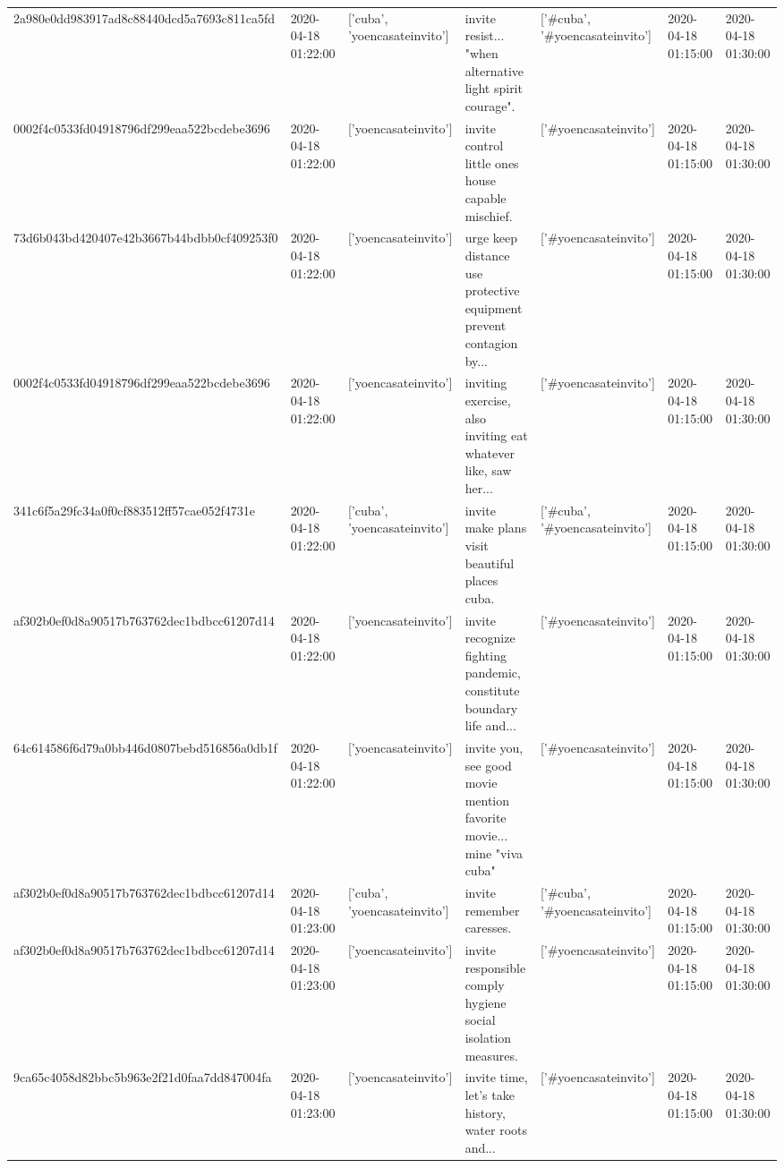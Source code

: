\begin{tabular}{lllllll}
2a980e0dd983917ad8c88440dcd5a7693c811ca5fd & 2020-04-18 01:22:00 & ['cuba', 'yoencasateinvito'] & invite resist... "when alternative light spirit courage". & ['#cuba', '#yoencasateinvito'] & 2020-04-18 01:15:00 & 2020-04-18 01:30:00 \\
0002f4c0533fd04918796df299eaa522bcdebe3696 & 2020-04-18 01:22:00 & ['yoencasateinvito'] & invite control little ones house capable mischief. & ['#yoencasateinvito'] & 2020-04-18 01:15:00 & 2020-04-18 01:30:00 \\
73d6b043bd420407e42b3667b44bdbb0cf409253f0 & 2020-04-18 01:22:00 & ['yoencasateinvito'] & urge keep distance use protective equipment prevent contagion by... & ['#yoencasateinvito'] & 2020-04-18 01:15:00 & 2020-04-18 01:30:00 \\
0002f4c0533fd04918796df299eaa522bcdebe3696 & 2020-04-18 01:22:00 & ['yoencasateinvito'] & inviting exercise, also inviting eat whatever like, saw her... & ['#yoencasateinvito'] & 2020-04-18 01:15:00 & 2020-04-18 01:30:00 \\
341c6f5a29fc34a0f0cf883512ff57cae052f4731e & 2020-04-18 01:22:00 & ['cuba', 'yoencasateinvito'] & invite make plans visit beautiful places cuba. & ['#cuba', '#yoencasateinvito'] & 2020-04-18 01:15:00 & 2020-04-18 01:30:00 \\
af302b0ef0d8a90517b763762dec1bdbcc61207d14 & 2020-04-18 01:22:00 & ['yoencasateinvito'] & invite recognize fighting pandemic, constitute boundary life and... & ['#yoencasateinvito'] & 2020-04-18 01:15:00 & 2020-04-18 01:30:00 \\
64c614586f6d79a0bb446d0807bebd516856a0db1f & 2020-04-18 01:22:00 & ['yoencasateinvito'] & invite you, see good movie mention favorite movie... mine "viva cuba" & ['#yoencasateinvito'] & 2020-04-18 01:15:00 & 2020-04-18 01:30:00 \\
af302b0ef0d8a90517b763762dec1bdbcc61207d14 & 2020-04-18 01:23:00 & ['cuba', 'yoencasateinvito'] & invite remember caresses. & ['#cuba', '#yoencasateinvito'] & 2020-04-18 01:15:00 & 2020-04-18 01:30:00 \\
af302b0ef0d8a90517b763762dec1bdbcc61207d14 & 2020-04-18 01:23:00 & ['yoencasateinvito'] & invite responsible comply hygiene social isolation measures. & ['#yoencasateinvito'] & 2020-04-18 01:15:00 & 2020-04-18 01:30:00 \\
9ca65c4058d82bbc5b963e2f21d0faa7dd847004fa & 2020-04-18 01:23:00 & ['yoencasateinvito'] & invite time, let's take history, water roots and... & ['#yoencasateinvito'] & 2020-04-18 01:15:00 & 2020-04-18 01:30:00 \\

\end{tabular}
